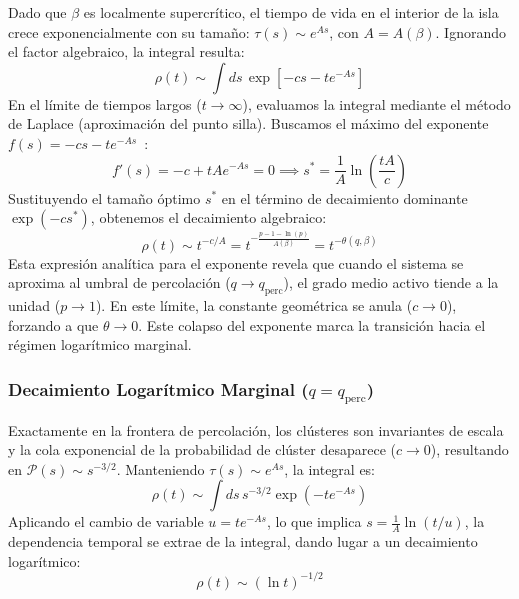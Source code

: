 \documentclass[%
reprint,
amsmath,amssymb,
aps,
]{revtex4-2}
\begin{document}
	Dado que $\beta$ es localmente supercrítico, el tiempo de vida en el interior de la isla crece exponencialmente con su tamaño: $\tau(s) \sim e^{As}$, con $A = A(\beta)$. Ignorando el factor algebraico, la integral resulta:
	\begin{equation}
		\rho(t) \sim \int ds \, \exp\left[ -c s - t e^{-A s} \right]
	\end{equation}
	En el límite de tiempos largos ($t \to \infty$), evaluamos la integral mediante el método de Laplace (aproximación del punto silla). Buscamos el máximo del exponente $f(s) = -c s - t e^{-A s}$~\cite{Muñoz2010}:
	\begin{equation}
		f'(s) = -c + t A e^{-A s} = 0 \implies s^* = \frac{1}{A} \ln\left(\frac{t A}{c}\right)
	\end{equation}
	Sustituyendo el tamaño óptimo $s^*$ en el término de decaimiento dominante $\exp(-c s^*)$, obtenemos el decaimiento algebraico:
	\begin{equation}
		\rho(t) \sim t^{-c/A} = t^{-\frac{p - 1 - \ln(p)}{A(\beta)}} = t^{-\theta(q,\beta)}
	\end{equation}
	Esta expresión analítica para el exponente revela que cuando el sistema se aproxima al umbral de percolación ($q \to q_{\text{perc}}$), el grado medio activo tiende a la unidad ($p \to 1$). En este límite, la constante geométrica se anula ($c \to 0$), forzando a que $\theta \to 0$. Este colapso del exponente marca la transición hacia el régimen logarítmico marginal.
	
	\subsubsection{Decaimiento Logarítmico Marginal ($q = q_{\text{perc}}$)~\cite{Muñoz2010,Noest1986}}
	Exactamente en la frontera de percolación, los clústeres son invariantes de escala y la cola exponencial de la probabilidad de clúster desaparece ($c \to 0$), resultando en $\mathcal{P}(s) \sim s^{-3/2}$. Manteniendo $\tau(s) \sim e^{As}$, la integral es:
	\begin{equation}
		\rho(t) \sim \int ds \, s^{-3/2} \exp\left( -t e^{-A s} \right)
	\end{equation}
	Aplicando el cambio de variable $u = t e^{-A s}$, lo que implica $s = \frac{1}{A} \ln(t/u)$, la dependencia temporal se extrae de la integral, dando lugar a un decaimiento logarítmico:
	\begin{equation}
		\rho(t) \sim (\ln t)^{-1/2}
	\end{equation}
	
\end{document}
